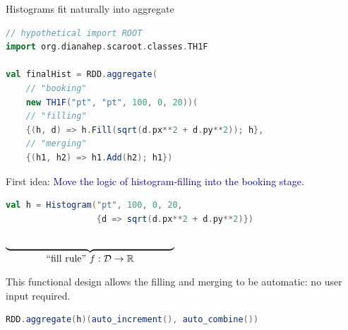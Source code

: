 \documentclass{beamer}
\begin{document}
\begin{frame}[fragile]{Histograms fit naturally into aggregate}

\begin{lstlisting}[language=scala]
// hypothetical import ROOT
import org.dianahep.scaroot.classes.TH1F

val finalHist = RDD.aggregate(
    // "booking"
    new TH1F("pt", "pt", 100, 0, 20))(
    // "filling"
    {(h, d) => h.Fill(sqrt(d.px**2 + d.py**2)); h},
    // "merging"
    {(h1, h2) => h1.Add(h2); h1})
\end{lstlisting}

\end{frame}

\begin{frame}[fragile]{First idea:}
\textcolor{darkblue}{\large Move the logic of histogram-filling into the booking stage.}

\begin{lstlisting}[language=scala]
val h = Histogram("pt", 100, 0, 20,
                  {d => sqrt(d.px**2 + d.py**2)})
\end{lstlisting}

\vspace{-\baselineskip} \hfill $\underbrace{\mbox{\hspace{6.0 cm}}}_{\mbox{``fill rule'' } {\displaystyle f: \mathcal{D} \to \mathbb{R}}}$ \hspace{0.7 cm}

\vfill
This functional design allows the filling and merging to be automatic: no user input required.

\begin{lstlisting}[language=scala]
RDD.aggregate(h)(auto_increment(), auto_combine())
\end{lstlisting}
\end{frame}
\end{document}

